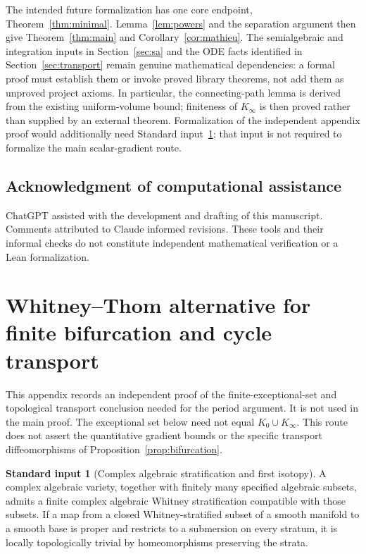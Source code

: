 \documentclass[11pt]{article}
\numberwithin{equation}{section}
\theoremstyle{definition}
\newtheorem{standard}[theorem]{Standard input}
\theoremstyle{remark}
\begin{document}
The intended future formalization has one core endpoint,
Theorem~\ref{thm:minimal}. Lemma~\ref{lem:powers} and the separation
argument then give Theorem~\ref{thm:main} and
Corollary~\ref{cor:mathieu}. The semialgebraic and integration inputs in
Section~\ref{sec:sa} and the ODE facts identified in
Section~\ref{sec:transport} remain genuine mathematical dependencies:
a formal proof must establish them or invoke proved library theorems,
not add them as unproved project axioms. In particular, the connecting-path
lemma is derived from the existing uniform-volume bound; finiteness of
$K_\infty$ is then proved rather than supplied by an external theorem.
Formalization of the independent appendix proof would additionally need
Standard input~\ref{std:whitney}; that input is not required to formalize
the main scalar-gradient route.

\subsection*{Acknowledgment of computational assistance}
ChatGPT assisted with the development and drafting of this manuscript.
Comments attributed to Claude informed revisions. These tools and their
informal checks do not constitute independent mathematical verification
or a Lean formalization.

\appendix
\section{Whitney--Thom alternative for finite bifurcation and cycle transport}\label{app:whitney-thom}
This appendix records an independent proof of the finite-exceptional-set
and topological transport conclusion needed for the period argument. It
is not used in the main proof. The exceptional set below need not equal
$K_0\cup K_\infty$. This route does not assert the quantitative gradient
bounds or the specific transport diffeomorphisms of
Proposition~\ref{prop:bifurcation}.

\begin{standard}[Complex algebraic stratification and first isotopy]\label{std:whitney}
A complex algebraic variety, together with finitely many specified
algebraic subsets, admits a finite complex algebraic Whitney
stratification compatible with those subsets. If a map from a closed
Whitney-stratified subset of a smooth manifold to a smooth base is proper
and restricts to a submersion on every stratum, it is locally topologically
trivial by homeomorphisms preserving the strata.
\end{standard}
\end{document}
